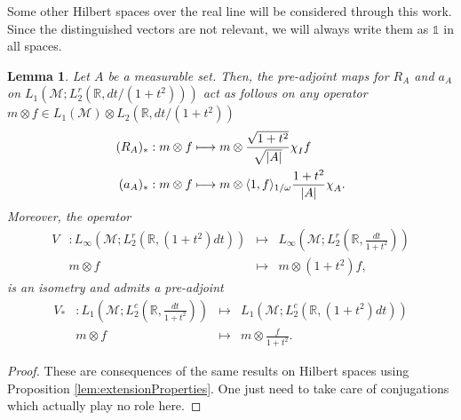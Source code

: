 \documentclass[psamsfonts]{amsart}
\newtheorem{lemma}[theorem]{Lemma}
\newcommand*{\bigchi}{\mbox{\large$\chi$}}
\newcommand{\Lone}{L_1}
\newcommand{\Linfty}{L_\infty}
\newcommand{\Ltwo}{L_2}
\newcommand{\Ltwoc}{L_2^c}
\newcommand{\Ltwor}{L_2^r}
\begin{document}
    
    Some other Hilbert spaces over the real line will be considered through this work. Since the distinguished vectors are not relevant, we will always write them as $\mathds{1}$ in all spaces.


    \begin{lemma}\label{lem:pre-adjoint}
        Let $A$ be a measurable set. Then, the pre-adjoint maps for $R_A$ and $a_A$ on $\Lone(\mathcal{M};\Ltwor(\mathbb{R},dt/(1+t^2)))$ act as follows on  any operator $m \otimes  f \in \Lone(\mathcal{M}) \otimes \Ltwo(\mathbb{R},dt/(1+t^2))$
        \begin{align*}
            (R_A)_* &: m \otimes f \longmapsto m \otimes \frac{\sqrt{1+t^2}}{\sqrt{|A|}} \bigchi_{I}f \\
            (a_A)_* &: m \otimes f \longmapsto m \otimes  \langle 1, f \rangle_{1/\omega} \frac{1+t^2}{|A|}\bigchi_A.
        \end{align*}
        Moreover, the operator
        $$
            \begin{array}{cccc}
                V &: \Linfty(\mathcal{M};\Ltwor(\mathbb{R},(1+t^2)dt)) & \longmapsto & \Linfty(\mathcal{M};\Ltwor(\mathbb{R},\frac{dt}{1+t^2})) \\
                & m \otimes  f &\longmapsto & m \otimes  (1+t^2)f,
            \end{array}
        $$
        is an isometry and admits a pre-adjoint
        $$
            \begin{array}{cccc}
                V_* &: \Lone(\mathcal{M};\Ltwoc(\mathbb{R},\frac{dt}{1+t^2})) & \longmapsto & \Lone(\mathcal{M};\Ltwoc(\mathbb{R},(1+t^2)dt)) \\
                & m \otimes f  &\longmapsto & m \otimes \frac{f}{1+t^2}.
            \end{array}
        $$
      \end{lemma}
      \begin{proof}
    These are consequences of the same results on Hilbert spaces using Proposition \ref{lem:extensionProperties}. One just need to take care of conjugations which actually play no role here. 
    \end{proof}
\end{document}
